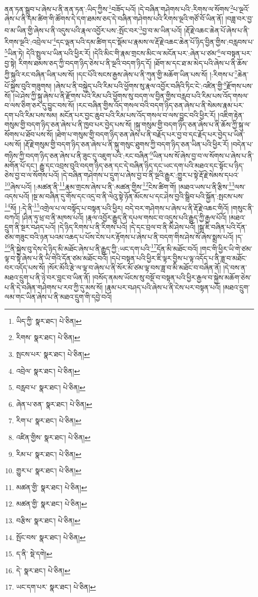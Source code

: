 ནན་ཏན་སྒྲུབ་པ་ཞེས་པ་ནི་ནན་ཏན་:ཡིད་ཀྱིས་\footnote{ཡིད་ཀྱི་  སྣར་ཐང་།  པེ་ཅིན། }བཟོད་པའོ། །དེ་བཞིན་གཤེགས་པའི་:རིགས་ལ་སོགས་\footnote{རིགས་  སྣར་ཐང་།  པེ་ཅིན། }པ་ལྔའོ་ཞེས་པ་ནི་དམ་ཚིག་གི་ཚོགས་དེ་དག་ཐམས་ཅད་དེ་བཞིན་གཤེགས་པའི་རིགས་ལྔའི་གཙོ་བོ་ཡིན་ནོ། །བཟླ་བར་བྱ་བ་མ་ཡིན་གྱི་ཞེས་པ་ནི་འདུས་པའི་རྣལ་འབྱོར་པས་:སྤོང་བར་\footnote{སྤངས་པར་  སྣར་ཐང་།  པེ་ཅིན། }བྱ་བ་མ་ཡིན་པའོ། །རྡོ་རྗེ་འཆང་ཆེན་པོ་ཞེས་པ་ནི་རིགས་ལྔའི་:འབྲེལ་པ་\footnote{འབྲེལ་  སྣར་ཐང་།  པེ་ཅིན། }དང་ལྡན་པའི་དམ་ཚིག་དང་སྡོམ་པ་རྣམས་ལ་རྡོ་རྗེ་འཆང་ཆེན་པོ་ཉིད་བྱིན་གྱིས་:བརླབས་པ་\footnote{བརླབ་པ་  སྣར་ཐང་།  པེ་ཅིན། }ཡིན་ཏེ། དེའི་སྤྲུལ་པ་ཡིན་པའི་ཕྱིར་རོ། །དེའི་མིང་གི་རྣམ་གྲངས་མིང་ལ་མངོན་པར་:ཞེན་པ་ཙམ་\footnote{ཞེན་པ་ཅན་  སྣར་ཐང་།  པེ་ཅིན། }ལ་བསྟན་པར་བྱ་སྟེ། རིགས་ཐམས་ཅད་ཀྱི་བདག་ཉིད་ཅེས་པ་ནི་ལྔའི་བདག་ཉིད་དོ། །ཐོག་མ་དང་ཐ་མ་མེད་པའི་ཞེས་པ་ནི་ཆོས་ཀྱི་སྐུའི་རང་བཞིན་ཡིན་པས་སོ། །དང་པོའི་སངས་རྒྱས་ཞེས་པ་ནི་ཀུན་གྱི་མཆོག་ཡིན་པས་སོ། །:རིགས་པ་\footnote{རིག་པ་  སྣར་ཐང་།  པེ་ཅིན། }ཆེན་པོ་སྐྱེས་བུའི་གཟུགས། །ཞེས་པ་ནི་བསྐྱེད་པའི་རིམ་པའི་ཕྱོགས་སུ་རྣལ་འབྱོར་བཞིའི་ཏིང་ངེ་:འཛིན་གྱི་\footnote{འཛིན་གྱིས་  སྣར་ཐང་།  པེ་ཅིན། }རྫོགས་པས་སོ། །ཡེ་ཤེས་ཀྱི་སྐུ་ཞེས་པ་ནི་རྫོགས་པའི་རིམ་པའི་ཕྱོགས་སུ་བདག་ལ་བྱིན་གྱིས་བརླབ་པའི་རིམ་པས་འོད་གསལ་བ་ལས་ཅིག་ཅར་དུ་བྱུང་བས་སོ། །རང་བཞིན་གྱིས་འོད་གསལ་བའི་བདག་ཉིད་ཅན་ཞེས་པ་ནི་སེམས་རྣམ་པར་དག་པའི་རིམ་པས་སམ། མངོན་པར་བྱང་ཆུབ་པའི་རིམ་པས་འོད་གསལ་བ་ལས་བྱུང་བའི་ཕྱིར་རོ། །འཇིག་རྟེན་གསུམ་གྱི་བདག་ཉིད་ཅན་ཞེས་པ་ནི་ཁྱབ་པར་བྱེད་པས་སོ། །སྐུ་གསུམ་གྱི་བདག་ཉིད་ཅན་ཞེས་པ་ནི་ཆོས་ཀྱི་སྐུ་ལ་སོགས་པ་ཐོབ་པས་སོ། །ཐེག་པ་གསུམ་གྱི་བདག་ཉིད་ཅན་ཞེས་པ་ནི་བརྗོད་པར་བྱ་བ་དང་རྗོད་པར་བྱེད་པ་ཡིན་པས་སོ། །རྡོ་རྗེ་གསུམ་གྱི་བདག་ཉིད་ཅན་ཞེས་པ་ནི་སྐུ་གསུང་ཐུགས་ཀྱི་བདག་ཉིད་ཅན་ཡིན་པའི་ཕྱིར་རོ། །བདེན་པ་གཉིས་ཀྱི་བདག་ཉིད་ཅན་ཞེས་པ་ནི་ཟུང་དུ་འཇུག་པའི་:རང་བཞིན་\footnote{རིམ་པ་  སྣར་ཐང་།  པེ་ཅིན། }ཡིན་པས་སོ་ཞེས་བྱ་བ་ལ་སོགས་པ་ཞེས་པ་ནི་མགོན་པོ་དང་། རྒྱུ་དང་འབྲས་བུའི་བདག་ཉིད་ཅན་དང་དེ་བཞིན་ཉིད་དང་ཡང་དག་པའི་མཐའ་དང་སྟོང་པ་ཉིད་ཅེས་བྱ་བ་ལ་སོགས་པའོ། །དེ་བཞིན་གཤེགས་པ་དྲུག་པ་ཞེས་བྱ་བ་ནི་ལྔའི་རྒྱུར་:གྱུར་པ་སྟེ་རྡོ་རྗེ་སེམས་དཔའ་\footnote{གྱུར་པ་  སྣར་ཐང་།  པེ་ཅིན། }ཞེས་པའོ། །:མཚན་ནི་\footnote{མཚན་གྱི་  སྣར་ཐང་།  པེ་ཅིན། }རྣམ་གྲངས་ཞེས་པ་ནི་:མཚན་གྱིས་\footnote{མཚན་གྱི་  སྣར་ཐང་།  པེ་ཅིན། }ངེས་ཚིག་གོ། །མཐའ་ཡས་པ་ནི་རྩིས་\footnote{བརྩིས་  སྣར་ཐང་།  པེ་ཅིན། }ལས་འདས་པའོ། །སྔ་མ་བཞིན་དུ་གོས་དང་འདྲ་བ་ནི་ལེའུ་སྟེ་ཉོན་མོངས་པ་དང་ཤེས་བྱའི་སྒྲིབ་པའི་སྐྱོན་:སྤངས་པས་\footnote{སྤོང་བས་  སྣར་ཐང་།  པེ་ཅིན། }སོ། །:དེ་ནི་\footnote{ད་ནི་  སྡེ་དགེ། }འགྲེལ་པ་ལ་བསྟོད་པ་བསྟན་པའི་ཕྱིར། བདེ་བར་གཤེགས་པ་ཞེས་པ་ནི་རྡོ་རྗེ་འཆང་གིའོ། །གསུང་ནི་བཀའོ། །ཤིན་ཏུ་ཕྲ་བ་ནི་མཁས་པའོ། །རྣལ་འབྱོར་རྒྱུད་ནི་དཔལ་གསང་བ་འདུས་པའི་རྒྱུད་ཀྱི་རྒྱལ་པོའོ། །མཐའ་དྲུག་ནི་སྔར་བཤད་པའོ། །དེ་ཉིད་རིགས་པ་ནི་རིགས་པའོ། །དེ་དང་བྲལ་བ་ནི་མི་ཤེས་པའོ། །སྒྲ་ཇི་བཞིན་པའི་དོན་ཙམ་གཟུང་བའི་ཉན་པའམ་འཆད་པ་པོས་ངེས་པར་རྟོགས་པ་ཞེས་པ་ནི་བདག་གིས་ཤེས་སོ་ཞེས་སྨྲས་པའོ། །ད་\footnote{དེ་  སྣར་ཐང་།  པེ་ཅིན། }ནི་སྐྱེས་བུ་དེས་དེ་ཉིད་མི་མཐོང་ཞེས་པ་ནི་རྒྱུད་ཀྱི་:ཡང་དག་པའི་\footnote{ཡང་དག་པར་  སྣར་ཐང་།  པེ་ཅིན། }དོན་མི་མཐོང་བའོ། །གང་གི་ཕྱིར་ཡི་གེ་ཙམ་ལྟ་བ་སྟེ་ཞེས་པ་ནི་ཡི་གེའི་དོན་ཙམ་མཐོང་བའོ། །དཔེ་བསྟན་པའི་ཕྱིར་ཇི་ལྟར་བྱིས་པ་ལྟ་འདོད་པ་ནི་ཟླ་བ་མཐོང་བར་འདོད་པས་སོ། །སོར་མོའི་རྩེ་ལ་ལྟ་བ་ཞེས་པ་ནི་སོར་མོ་ཙམ་ལྟ་བས་ཟླ་བ་མི་མཐོང་བ་བཞིན་ནོ། །དེ་བས་ན་མཐའ་དྲུག་པ་ནི་ཉེ་བར་བླང་བ་ཡིན་ནོ། །བསོད་ནམས་ཡོངས་སུ་བསྔོ་བ་བསྟན་པའི་ཕྱིར་རྒྱལ་བ་སྐྱེས་མཆོག་ཅེས་པ་ནི་དེ་བཞིན་གཤེགས་པ་རབ་ཀྱི་དུ་མས་སོ། །རྣམ་པར་བཤད་པའི་ཞེས་པ་ནི་ངེས་པར་བསྟན་པའོ། །མཐའ་དྲུག་ལམ་གང་ཡིན་ཞེས་པ་ནི་མཐའ་དྲུག་གི་དབྱེ་བའོ། 